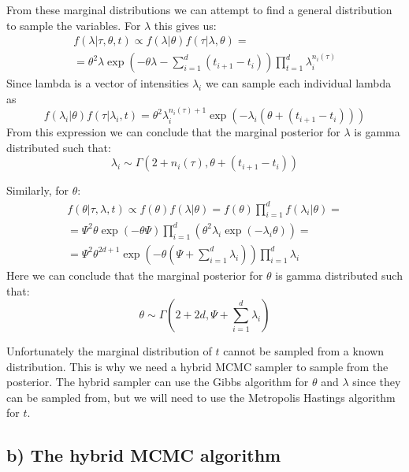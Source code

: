 \documentclass[a4paper]{article}
\begin{document}
From these marginal distributions we can attempt to find a general distribution to sample the variables. For $\lambda$ this gives us:
\begin{equation}
    \begin{gathered}
        f(\lambda | \tau, \theta, t) \propto f(\lambda|\theta)f(\tau|\lambda,\theta) = \\ = \theta^2\lambda\exp(-\theta\lambda-\sum_{i=1}^d(t_{i+1}-t_i))\prod_{t=1}^d\lambda_i^{n_i(\tau)}
    \end{gathered}
\end{equation}
Since lambda is a vector of intensities $\lambda_i$ we can sample each individual lambda as 
\begin{equation}
    f(\lambda_i|\theta)f(\tau|\lambda_i,t) = \theta^2\lambda_i^{n_i(\tau)+1}\exp(-\lambda_i(\theta + (t_{i+1}-t_i)))
\end{equation}
From this expression we can conclude that the marginal posterior for $\lambda$ is gamma distributed such that:
\begin{equation}
    \lambda_i \sim \Gamma(2+n_i(\tau), \theta + (t_{i+1} - t_i))
\end{equation}

Similarly, for $\theta$:
\begin{equation}
    \begin{gathered}
        f(\theta|\tau, \lambda, t) \propto f(\theta)f(\lambda|\theta) = f(\theta)\prod_{i=1}^d f(\lambda_i|\theta)= \\
        = \Psi^2\theta\exp(-\theta\Psi)\prod_{i=1}^d(\theta^2\lambda_i\exp(-\lambda_i\theta)) = \\
        = \Psi^2\theta^{2d+1}\exp(-\theta(\Psi+\sum_{i=1}^d\lambda_i))\prod_{i=1}^d\lambda_i
    \end{gathered}
\end{equation}
Here we can conclude that the marginal posterior for $\theta$ is gamma distributed such that:
\begin{equation}
    \theta \sim \Gamma(2+2d, \Psi+\sum_{i=1}^d\lambda_i)
\end{equation}

Unfortunately the marginal distribution of $t$ cannot be sampled from a known distribution. This is why we need a hybrid MCMC sampler to sample from the posterior. The hybrid sampler can use the Gibbs algorithm for $\theta$ and $\lambda$ since they can be sampled from, but we will need to use the Metropolis Hastings algorithm for $t$.


\subsection*{b) The hybrid MCMC algorithm}
\end{document}
